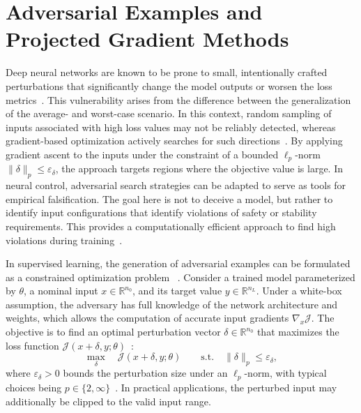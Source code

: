 \section{Adversarial Examples and Projected Gradient Methods}
\label{sec:adversarial-examples}
Deep neural networks are known to be prone to small, intentionally crafted perturbations that significantly change the model 
outputs or worsen the loss metrics~\cite{szegedyIntriguingPropertiesNeural2014,goodfellowExplainingHarnessingAdversarial2015}. 
This vulnerability arises from the difference between the generalization of the average- and worst-case scenario. 
In this context, random sampling of inputs associated with high loss values may not be reliably detected, 
whereas gradient-based optimization actively searches for such directions~. 
By applying gradient ascent to the inputs under the constraint of a bounded $\ell_p$-norm 
$\|\delta\|_p \le \varepsilon_\delta$, the approach targets regions where the objective value is large.
In neural control, adversarial search strategies can be adapted to serve as tools for empirical falsification. 
The goal here is not to deceive a model, but rather to identify input configurations that
identify violations of safety or stability requirements. This provides a computationally efficient approach to find 
high violations during training~\cite{yangLyapunovstableNeuralControl2024}.

In supervised learning, the generation of adversarial examples can be formulated as a constrained optimization problem~
\cite{goodfellowExplainingHarnessingAdversarial2015,madryDeepLearningModels2019}. 
Consider a trained model parameterized by $\theta$, a nominal input $x \in \mathbb{R}^{n_0}$, 
and its target value $y \in \mathbb{R}^{n_L}$. 
Under a white-box assumption, the adversary has full knowledge of the network architecture and weights, 
which allows the computation of accurate input gradients $\nabla_x \mathcal{J}$. 
The objective is to find an optimal perturbation vector $\delta \in \mathbb{R}^{n_0}$ 
that maximizes the loss function $\mathcal{J}(x + \delta, y; \theta)$~\cite{madryDeepLearningModels2019}:
\begin{equation}
    \label{eq:adversarial-problem}
    \max_{\delta}
    \quad
    \mathcal{J}(x + \delta, y; \theta)
    \qquad
    \text{s.t.}
    \quad
    \|\delta\|_p \leq \varepsilon_\delta,
\end{equation}
where $\varepsilon_\delta > 0$ bounds the perturbation size under an $\ell_p$-norm, with typical choices 
being $p \in \{2, \infty\}$~\cite{goodfellowExplainingHarnessingAdversarial2015,madryDeepLearningModels2019}.
In practical applications, the perturbed input may additionally be clipped to
the valid input range.



